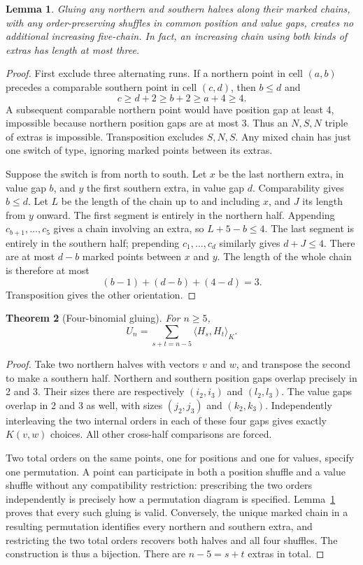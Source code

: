 \documentclass[11pt,letterpaper]{article}
\newtheorem{theorem}{Theorem}[section]
\newtheorem{lemma}[theorem]{Lemma}
\theoremstyle{remark}\newtheorem{remark}[theorem]{Remark}
\numberwithin{equation}{section}
\newcommand{\pair}[2]{\langle #1,#2\rangle_K}
\begin{document}
\begin{lemma}\label{upo:ex5:lem:mixed}
Gluing any northern and southern halves along their marked chains,
with any order-preserving shuffles in common position and value gaps,
creates no additional increasing five-chain. In fact, an increasing
chain using both kinds of extras has length at most three.
\end{lemma}
\begin{proof}
First exclude three alternating runs. If a northern point in cell
$(a,b)$ precedes a comparable southern point in cell $(c,d)$, then
$b\le d$ and
\[
 c\ge d+2\ge b+2\ge a+4\ge4.
\]
A subsequent comparable northern point would have position gap at
least 4, impossible because northern position gaps are at most 3.
Thus an $N,S,N$ triple of extras is impossible. Transposition excludes
$S,N,S$. Any mixed chain has just one switch of type, ignoring marked
points between its extras.

Suppose the switch is from north to south. Let $x$ be the last northern
extra, in value gap $b$, and $y$ the first southern extra, in value gap
$d$. Comparability gives $b\le d$. Let $L$ be the length of the chain
up to and including $x$, and $J$ its length from $y$ onward. The first
segment is entirely in the northern half. Appending
$c_{b+1},\ldots,c_5$ gives a chain involving an extra, so
$L+5-b\le4$. The last segment is entirely in the southern half;
prepending $c_1,\ldots,c_d$ similarly gives $d+J\le4$.
There are at most $d-b$ marked points between $x$ and $y$. The length
of the whole chain is therefore at most
\[
 (b-1)+(d-b)+(4-d)=3.
\]
Transposition gives the other orientation.
\end{proof}

\begin{theorem}[Four-binomial gluing]\label{upo:ex5:thm:gluing}
For $n\ge5$,
\begin{equation}\label{upo:ex5:eq:gluing}
 U_n=\sum_{s+t=n-5}\pair{H_s}{H_t}.
\end{equation}
\end{theorem}
\begin{proof}
Take two northern halves with vectors $v$ and $w$, and transpose the
second to make a southern half. Northern and southern position gaps
overlap precisely in 2 and 3. Their sizes there are respectively
$(i_2,i_3)$ and $(l_2,l_3)$. The value gaps overlap in 2 and 3 as well,
with sizes $(j_2,j_3)$ and $(k_2,k_3)$. Independently interleaving the
two internal orders in each of these four gaps gives exactly $K(v,w)$
choices. All other cross-half comparisons are forced.

Two total orders on the same points, one for positions and one for
values, specify one permutation. A point can participate in both a
position shuffle and a value shuffle without any compatibility
restriction: prescribing the two orders independently is precisely
how a permutation diagram is specified. Lemma~\ref{upo:ex5:lem:mixed} proves
that every such gluing is valid. Conversely, the unique marked chain
in a resulting permutation identifies every northern and southern
extra, and restricting the two total orders recovers both halves and
all four shuffles. The construction is thus a bijection. There are
$n-5=s+t$ extras in total.
\end{proof}
\end{document}
